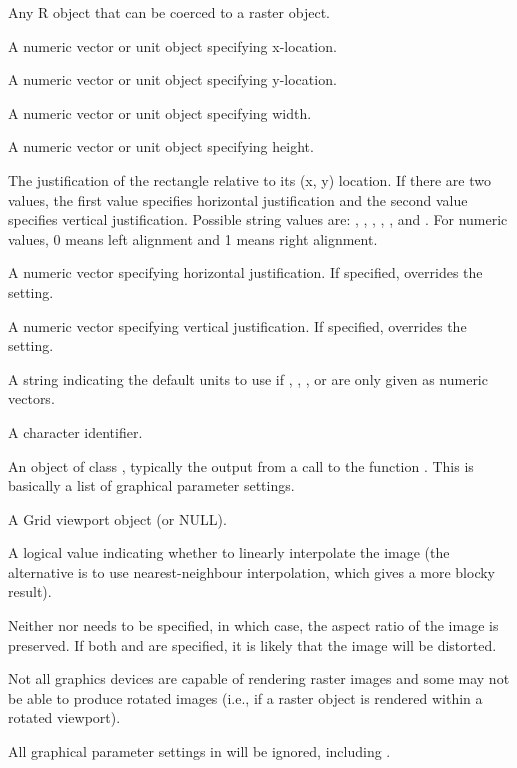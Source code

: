 \begin{Arguments}
\begin{ldescription}
\item[\code{image}] 
Any R object that can be coerced to a raster object.

\item[\code{x}] A numeric vector or unit object specifying x-location.
\item[\code{y}] A numeric vector or unit object specifying y-location.
\item[\code{width}] A numeric vector or unit object specifying width.
\item[\code{height}] A numeric vector or unit object specifying height.
\item[\code{just}] The justification of the rectangle 
relative to its (x, y) location.  If there are two values, the first
value specifies horizontal justification and the second value specifies
vertical justification.  Possible string values are: ,
, , , ,
and .  For numeric values, 0 means left alignment
and 1 means right alignment.

\item[\code{hjust}] A numeric vector specifying horizontal justification.
If specified, overrides the  setting.
\item[\code{vjust}] A numeric vector specifying vertical justification.
If specified, overrides the  setting.
\item[\code{default.units}] A string indicating the default units to use
if , , , or 
are only given as numeric vectors. 
\item[\code{name}]  A character identifier. 
\item[\code{gp}] An object of class , typically the output
from a call to the function .  This is basically
a list of graphical parameter settings.
\item[\code{vp}] A Grid viewport object (or NULL).
\item[\code{interpolate}] 
A logical value indicating whether to linearly interpolate the
image (the alternative is to use nearest-neighbour interpolation,
which gives a more blocky result).

\end{ldescription}
\end{Arguments}
%
\begin{Details}\relax
Neither  nor  needs to be specified,
in which case, the aspect ratio of the image is preserved.  If
both  and  are specified, it is likely
that the image will be distorted.

Not all graphics devices are capable of rendering raster images
and some may not be able to produce rotated images (i.e., if
a raster object is rendered within a rotated viewport).

All graphical parameter settings in  will be ignored,
including .
\end{Details}
